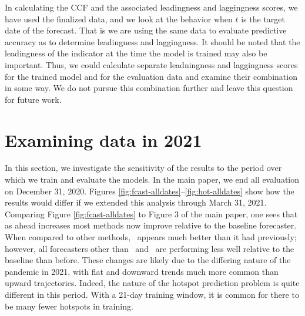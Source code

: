 In calculating the CCF and the associated leadingness and laggingness scores, we
have used the finalized data, and we look at the behavior when $t$ is the
target date of the forecast. That is we are using the same data to
evaluate predictive accuracy as to determine
leadingness and laggingness. It should be noted that the leadingness of the
indicator at the time the model is trained may also be important. Thus, we could
calculate separate leadningness and laggingness scores for the trained model and
for the evaluation data and examine their combination in some way. We do not
pursue this combination further and leave this question for future work.





\section{Examining data in 2021}

In this section, we investigate the sensitivity of the results to the
period over which we train and evaluate the models.  In the main
paper, we end all evaluation on December 31, 2020.  Figures
\ref{fig:fcast-alldates}--\ref{fig:hot-alldates} show how the
results would differ if we extended this analysis through March
  31, 2021. Comparing Figure \ref{fig:fcast-alldates} to Figure 3 of
the main paper, one sees that as ahead increases most methods now improve
relative to the baseline forecaster. When compared to other methods, 
\chngcli~appears much better than
it had previously; however, all forecasters other than \chngcov~and
\dv~are performing less well relative to the baseline than before.
These changes are likely due to the differing nature of the pandemic
in 2021, with flat and downward trends much more common than upward
trajectories.  Indeed, the nature of the hotspot prediction problem is
quite different in this period.  With a 21-day training window, it is
common for there to be many fewer hotspots in training.




